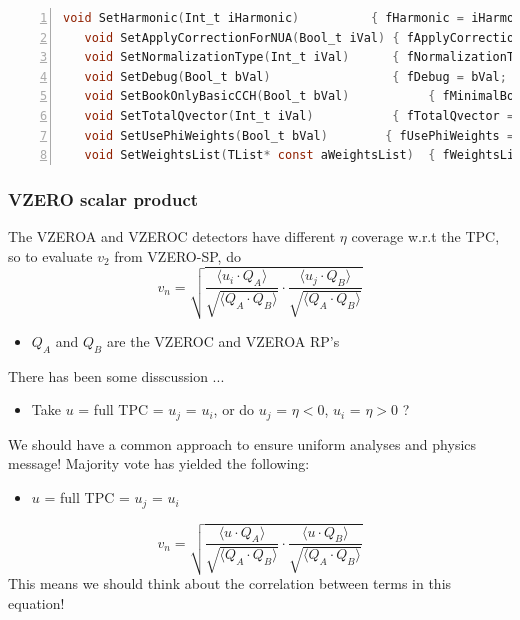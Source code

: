 \documentclass[a4paper]{book}
\numberwithin{equation}{subsection}
\begin{document}
\begin{lstlisting}[language=C, numbers=left]
   void SetHarmonic(Int_t iHarmonic)          { fHarmonic = iHarmonic; }
   void SetApplyCorrectionForNUA(Bool_t iVal) { fApplyCorrectionForNUA = iVal?1:0; }
   void SetNormalizationType(Int_t iVal)      { fNormalizationType = iVal; }
   void SetDebug(Bool_t bVal)                 { fDebug = bVal; }
   void SetBookOnlyBasicCCH(Bool_t bVal)           { fMinimalBook = bVal; }
   void SetTotalQvector(Int_t iVal)           { fTotalQvector = iVal; }
   void SetUsePhiWeights(Bool_t bVal)        { fUsePhiWeights = bVal; }
   void SetWeightsList(TList* const aWeightsList)  { fWeightsList = (TList*)aWeightsList->Clone(); }\end{lstlisting}


		\subsubsection{VZERO scalar product}
		
The VZEROA and VZEROC detectors have different $\eta$ coverage w.r.t the TPC, so to evaluate $v_2$ from VZERO-SP, do
\begin{equation}
v_n = \sqrt{\frac{\langle u_i \cdotp Q_A \rangle }{\sqrt{\langle Q_A \cdotp Q_B \rangle}} \cdotp \frac{\langle u_j \cdotp Q_B \rangle }{\sqrt{\langle Q_A \cdotp Q_B \rangle}}}
\nonumber
\end{equation}
\begin{itemize}
\item $Q_A$ and $Q_B$ are the VZEROC and VZEROA RP's
\end{itemize}
There has been some disscussion ...
\begin{itemize}
\item Take $u$ = full TPC = $u_j$ = $u_i$, or do $u_j$ = $\eta < 0$, $u_i$ = $\eta > 0$ ?
\end{itemize}
We should have a common approach to ensure uniform analyses and physics message!
Majority vote has yielded the following:
\begin{itemize}
\item $u$ = full TPC = $u_j$ = $u_i$
\end{itemize}
\begin{equation}
v_n = \sqrt{\frac{\langle u \cdotp Q_A \rangle }{\sqrt{\langle Q_A \cdotp Q_B \rangle}} \cdotp \frac{\langle u \cdotp Q_B \rangle }{\sqrt{\langle Q_A \cdotp Q_B \rangle}}}
\nonumber
\end{equation}
This means we should think about the \alert{correlation} between terms in this equation!
\end{document}
